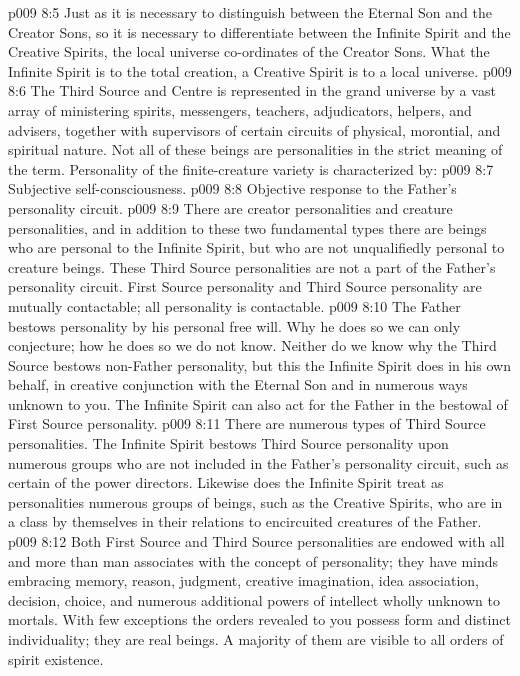 \vs p009 8:5 Just as it is necessary to distinguish between the Eternal Son and the Creator Sons, so it is necessary to differentiate between the Infinite Spirit and the Creative Spirits, the local universe co\hyp{}ordinates of the Creator Sons. What the Infinite Spirit is to the total creation, a Creative Spirit is to a local universe.
\vs p009 8:6 \pc The Third Source and Centre is represented in the grand universe by a vast array of ministering spirits, messengers, teachers, adjudicators, helpers, and advisers, together with supervisors of certain circuits of physical, morontial, and spiritual nature. Not all of these beings are personalities in the strict meaning of the term. Personality of the finite\hyp{}creature variety is characterized by:
\vs p009 8:7 \bibnobreakspace Subjective self\hyp{}consciousness.
\vs p009 8:8 \bibnobreakspace Objective response to the Father’s personality circuit.
\vs p009 8:9 \pc There are creator personalities and creature personalities, and in addition to these two fundamental types there are  beings who are personal to the Infinite Spirit, but who are not unqualifiedly personal to creature beings. These Third Source personalities are not a part of the Father’s personality circuit. First Source personality and Third Source personality are mutually contactable; all personality is contactable.
\vs p009 8:10 \pc The Father bestows personality by his personal free will. Why he does so we can only conjecture; how he does so we do not know. Neither do we know why the Third Source bestows non\hyp{}Father personality, but this the Infinite Spirit does in his own behalf, in creative conjunction with the Eternal Son and in numerous ways unknown to you. The Infinite Spirit can also act for the Father in the bestowal of First Source personality.
\vs p009 8:11 \pc There are numerous types of Third Source personalities. The Infinite Spirit bestows Third Source personality upon numerous groups who are not included in the Father’s personality circuit, such as certain of the power directors. Likewise does the Infinite Spirit treat as personalities numerous groups of beings, such as the Creative Spirits, who are in a class by themselves in their relations to encircuited creatures of the Father.
\vs p009 8:12 Both First Source and Third Source personalities are endowed with all and more than man associates with the concept of personality; they have minds embracing memory, reason, judgment, creative imagination, idea association, decision, choice, and numerous additional powers of intellect wholly unknown to mortals. With few exceptions the orders revealed to you possess form and distinct individuality; they are real beings. A majority of them are visible to all orders of spirit existence.
